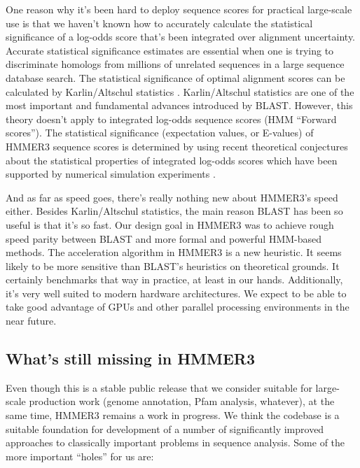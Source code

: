 One reason why it's been hard to deploy sequence scores for practical
large-scale use is that we haven't known how to accurately calculate
the statistical significance of a log-odds score that's been
integrated over alignment uncertainty. Accurate statistical
significance estimates are essential when one is trying to
discriminate homologs from millions of unrelated sequences in a large
sequence database search. The statistical significance of optimal
alignment scores can be calculated by Karlin/Altschul statistics
\citep{Karlin90,KarlinAltschul93}. Karlin/Altschul statistics are one
of the most important and fundamental advances introduced by BLAST.
However, this theory doesn't apply to integrated log-odds sequence
scores (HMM ``Forward scores'').  The statistical significance
(expectation values, or E-values) of HMMER3 sequence scores is
determined by using recent theoretical conjectures about the
statistical properties of integrated log-odds scores which have been
supported by numerical simulation experiments \citep{Eddy08}.

And as far as speed goes, there's really nothing new about HMMER3's
speed either. Besides Karlin/Altschul statistics, the main reason
BLAST has been so useful is that it's so fast.  Our design goal in
HMMER3 was to achieve rough speed parity between BLAST and more formal
and powerful HMM-based methods.  The acceleration algorithm in HMMER3
is a new heuristic. It seems likely to be more sensitive than BLAST's
heuristics on theoretical grounds. It certainly benchmarks that way in
practice, at least in our hands. Additionally, it's very well suited
to modern hardware architectures. We expect to be able to take good
advantage of GPUs and other parallel processing environments in the
near future.

\subsection{What's still missing in HMMER3}

Even though this is a stable public release that we consider suitable
for large-scale production work (genome annotation, Pfam analysis,
whatever), at the same time, HMMER3 remains a work in progress. We
think the codebase is a suitable foundation for development of a
number of significantly improved approaches to classically important
problems in sequence analysis. Some of the more important ``holes''
for us are:

